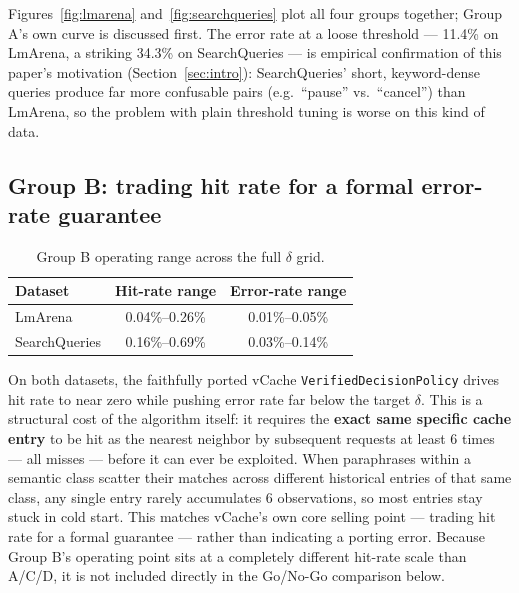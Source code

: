 \documentclass[11pt]{article}
\newenvironment{fittab}{\begin{lrbox}{\fittabbox}}{\end{lrbox}%
  \ifdim\wd\fittabbox>\linewidth\resizebox{\linewidth}{!}{\usebox{\fittabbox}}\else\usebox{\fittabbox}\fi}
\begin{document}
Figures~\ref{fig:lmarena} and~\ref{fig:searchqueries} plot all four groups together; Group A's own curve is discussed first. The error rate at a loose threshold --- 11.4\% on LmArena, a striking 34.3\% on SearchQueries --- is empirical confirmation of this paper's motivation (Section~\ref{sec:intro}): SearchQueries' short, keyword-dense queries produce far more confusable pairs (e.g.\ ``pause'' vs.\ ``cancel'') than LmArena, so the problem with plain threshold tuning is worse on this kind of data.

\subsection{Group B: trading hit rate for a formal error-rate guarantee}

\begin{table}[h]
\centering
\small
\begin{fittab}\begin{tabular}{@{}lcc@{}}
\toprule
\textbf{Dataset} & \textbf{Hit-rate range} & \textbf{Error-rate range} \\
\midrule
LmArena & 0.04\%--0.26\% & 0.01\%--0.05\% \\
SearchQueries & 0.16\%--0.69\% & 0.03\%--0.14\% \\
\bottomrule
\end{tabular}\end{fittab}
\caption{Group B operating range across the full $\delta$ grid.}
\end{table}

On both datasets, the faithfully ported vCache \texttt{Verified\allowbreak{}Decision\allowbreak{}Policy} drives hit rate to near zero while pushing error rate far below the target $\delta$. This is a structural cost of the algorithm itself: it requires the \textbf{exact same specific cache entry} to be hit as the nearest neighbor by subsequent requests at least 6 times --- all misses --- before it can ever be exploited. When paraphrases within a semantic class scatter their matches across different historical entries of that same class, any single entry rarely accumulates 6 observations, so most entries stay stuck in cold start. This matches vCache's own core selling point --- trading hit rate for a formal guarantee --- rather than indicating a porting error. Because Group B's operating point sits at a completely different hit-rate scale than A/C/D, it is not included directly in the Go/No-Go comparison below.
\end{document}
